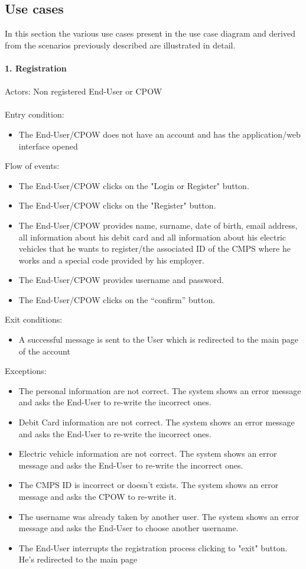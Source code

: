 \documentclass[a4paper]{report}
\begin{document}
\subsection{Use cases}
In this section the various use cases present in the use case diagram and derived from the scenarios previously described are illustrated in detail.\\ \\
\textbf{1. Registration}\label{uc:1}
\\
\\
Actors: Non registered End-User or CPOW\\ \\
Entry condition:
\begin{itemize}
\item The End-User/CPOW does not have an account and has the application/web interface opened
\end{itemize}
Flow of events:
\begin{itemize}
\item The End-User/CPOW clicks on the "Login or Register" button.
\item The End-User/CPOW clicks on the "Register" button.
\item The End-User/CPOW provides name, surname, date of birth, email address, all information about his debit card and all information about his electric vehicles that he wants to register/the associated ID of the CMPS where he works and a special code provided by his employer.
\item The End-User/CPOW provides username and password.
\item The End-User/CPOW clicks on the “confirm” button.
\end{itemize}
Exit conditions:
\begin{itemize}
\item A successful message is sent to the User which is redirected to the main page of the account
\end{itemize}
Exceptions:
\begin{itemize}
\item The personal information are not correct. The system shows an error message and asks the End-User to re-write the incorrect ones.
\item Debit Card information are not correct. The system shows an error message and asks the End-User to re-write the incorrect ones.
\item Electric vehicle information are not correct. The system shows an error message and asks the End-User to re-write the incorrect ones.
\item The CMPS ID is incorrect or doesn't exists. The system shows an error message and asks the CPOW to re-write it.
\item The username was already taken by another user. The system shows an error message and asks the End-User to choose another username.
\item The End-User interrupts the registration process clicking to "exit" button. He's redirected to the main page
\end{itemize}
\end{document}
